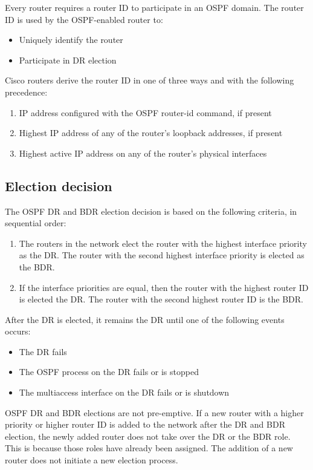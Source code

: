 Every router requires a router ID to participate in an OSPF domain. The router ID is used by the OSPF-enabled router to:

\begin{itemize}
\item Uniquely identify the router
\item Participate in DR election 
\end{itemize}

Cisco routers derive the router ID in one of three ways and with the following precedence: 

\begin{enumerate}
\item IP address configured with the OSPF router-id command, if present 
\item Highest IP address of any of the router’s loopback addresses, if present 
\item Highest active IP address on any of the router’s physical interfaces
\end{enumerate}

\subsection{Election decision}
	
The OSPF DR and BDR election decision is based on the following criteria, in sequential order:

\begin{enumerate}
\item The routers in the network elect the router with the highest interface priority as the DR. The router with the second highest interface priority is elected as the BDR.
\item If the interface priorities are equal, then the router with the highest router ID is elected the DR. The router with the second highest router ID is the BDR.
\end{enumerate}
	
After the DR is elected, it remains the DR until one of the following events occurs:

\begin{itemize}
\item The DR fails
\item The OSPF process on the DR fails or is stopped
\item The multiaccess interface on the DR fails or is shutdown
\end{itemize}
	
OSPF DR and BDR elections are not pre-emptive. If a new router with a higher priority or higher router ID is added to the network after the DR and BDR election, the newly added router does not take over the DR or the BDR role. This is because those roles have already been assigned. The addition of a new router does not initiate a new election process.\\


